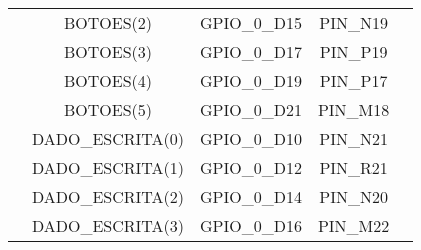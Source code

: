 \documentclass[amsmath,amssymb,floatfix]{report}
\begin{document}
\begin{table}[H]
\begin{tabular}{c|c|c|c|c|}
\multicolumn{1}{|c|}{}                           & BOTOES(2)               & GPIO\_0\_D15         & PIN\_N19                                                                                                                                                                              & \multicolumn{1}{l|}{}          \\ \cline{2-5} 
\multicolumn{1}{|c|}{}                           & BOTOES(3)               & GPIO\_0\_D17         & PIN\_P19                                                                                                                                                                              & \multicolumn{1}{l|}{}          \\ \cline{2-5} 
\multicolumn{1}{|c|}{}                           & BOTOES(4)               & GPIO\_0\_D19         & PIN\_P17                                                                                                                                                                              &                                \\ \cline{2-5} 
\multicolumn{1}{|c|}{}                           & BOTOES(5)               & GPIO\_0\_D21         & PIN\_M18                                                                                                                                                                              &                                \\ \cline{2-5} 
\multicolumn{1}{|c|}{}                           & DADO\_ESCRITA(0)        & GPIO\_0\_D10         & PIN\_N21                                                                                                                                                                              &   \\ \cline{2-5} 
\multicolumn{1}{|c|}{}                           & DADO\_ESCRITA(1)        & GPIO\_0\_D12         & PIN\_R21                                                                                                                                                                              &   \\ \cline{2-5} 
\multicolumn{1}{|c|}{}                           & DADO\_ESCRITA(2)        & GPIO\_0\_D14         & PIN\_N20                                                                                                                                                                              &      \\ \cline{2-5} 
\multicolumn{1}{|c|}{}                           & DADO\_ESCRITA(3)        & GPIO\_0\_D16         & PIN\_M22                                                                                                                                                                              &   \\ \cline{2-5} 

\end{tabular}
\end{table}
\end{document}

